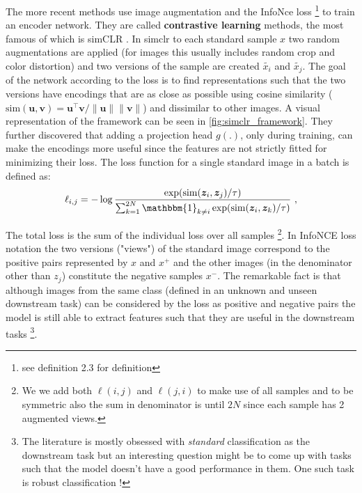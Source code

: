 \documentclass[../thesis.tex]{subfiles}
\begin{document}
	The more recent methods use image augmentation and the InfoNce loss \footnote{see \cite{arora_theoretical_2019} definition 2.3 for definition} to train an encoder network. They are called \textbf{contrastive learning} methods, the most famous of which is simCLR \cite{simclr_chen_simple_2020}. In simclr to each standard sample $x$ two random augmentations are applied (for images this usually includes random crop and color distortion) and two versions of the sample are created $\tilde{x_i}$ and $\tilde{x_j}$. The goal of the network according to the loss is to find representations such that the two versions have encodings that are as close as possible using cosine similarity ($\mathrm{sim}(\bm u,\bm v) = \bm u^\top \bm v / \lVert\bm u\rVert \lVert\bm v\rVert$) and dissimilar to other images. A visual representation of the framework can be seen in \ref{fig:simclr_framework}. They further discovered that adding a projection head $g(.)$, only during training, can make the encodings more useful since the features are not strictly fitted for minimizing their loss. The loss function for a single standard image in a batch is defined as:
	\begin{equation}
	\label{eq:loss}
	\ell_{i,j} = -\log \frac{\exp(\mathrm{sim}(\bm z_i, \bm z_j)/\tau)}{\sum_{k=1}^{2N} \mathbbm{1}_{k \neq i}\exp(\mathrm{sim}(\bm z_i, \bm z_k)/\tau)}~,
	\end{equation}
	
	The total loss is the sum of the individual loss over all samples \footnote{We we add both $\ell(i,j)$ and $\ell(j,i)$ to make use of all samples and to be symmetric also the sum in denominator is until $2N$ since each sample has 2 augmented views.}. In InfoNCE loss notation the two versions ("views") of the standard image correspond to the positive pairs represented by $x$ and $x^+$ and the other images (in the denominator other than $z_j$) constitute the negative samples $x^-$. The remarkable fact is that although images from the same class (defined in an unknown and unseen downstream task) can be considered by the loss as positive and negative pairs the model is still able to extract features such that they are useful in the downstream tasks \footnote{The literature is mostly obsessed with \textit{standard} classification as the downstream task but an interesting question might be to come up with tasks such that the model doesn't have a good performance in them. One such task is robust classification !}. 
	
\end{document}
